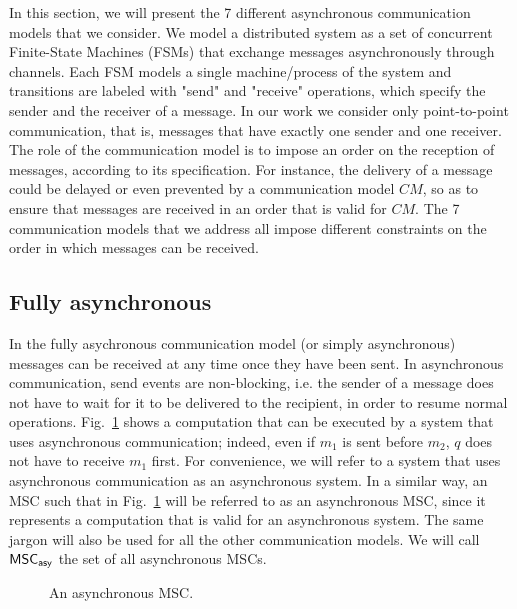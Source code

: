 
 In this section, we will present the 7 different asynchronous communication models that we consider. 
We model a distributed system as a set of concurrent Finite-State Machines (FSMs) that exchange messages asynchronously through channels. Each FSM models a single machine/process of the system and transitions are labeled with "send" and "receive" operations, which specify the sender and the receiver of a message. In our work we consider only point-to-point communication, that is, messages that have exactly one sender and one receiver. The role of the communication model is to impose an order on the reception of messages, according to its specification. For instance, the delivery of a message could be delayed or even prevented by a communication model $CM$, so as to ensure that messages are received in an order that is valid for $CM$. The 7 communication models that we address all impose different constraints on the order in which messages can be received.

\subsection{Fully asynchronous}
In the fully asychronous communication model (or simply asynchronous) messages can be received at any time once they have been sent. In asynchronous communication, send events are non-blocking, i.e. the sender of a message does not have to wait for it to be delivered to the recipient, in order to resume normal operations. Fig.~\ref{fig:fully_asy_ex} shows a computation that can be executed by a system that uses asynchronous communication; indeed, even if $m_1$ is sent before $m_2$, $q$ does not have to receive $m_1$ first. For convenience, we will refer to a system that uses asynchronous communication as an asynchronous system. In a similar way, an MSC such that in Fig.~\ref{fig:fully_asy_ex} will be referred to as an asynchronous MSC, since it represents a computation that is valid for an asynchronous system. The same jargon will also be used for all the other communication models. We will call $\mathsf{MSC}_{\mathsf{asy}}$ the set of all asynchronous MSCs.

\begin{figure}[h]
	\begin{center}
		\caption{An asynchronous MSC.}
		\label{fig:fully_asy_ex}
	\end{center}
\end{figure}

